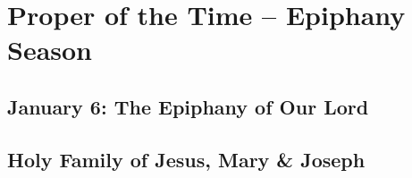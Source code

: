 {{\benedicamusdomino[2]{}
}

{
\chapter{Proper of the Time -- Epiphany Season}
\label{epiphany}
\section{January 6: The Epiphany of Our Lord}
\subtitle{ Class}

\subtitle{I \& II Vespers}

\def\definevesperspropersalt{}
\def\definevesperspropers{}
\def\vesperspropersaltnote{At I Vespers:}
\def\vesperspropersnote{At II Vespers:}
\def\prechapter{\vspace{-1\baselineskip}}
\def\beginchaptercols{\begin{parcolumns}[rulebetween,colwidths={1=0.42\linewidth}]{2}}


\benedicamusdomino{}
}

{
\section{Holy Family of Jesus, Mary \& Joseph}
\subtitle{ Class}

\subtitle{First Sunday after the Epiphany.}


\benedicamusdomino[2]{}
}

}